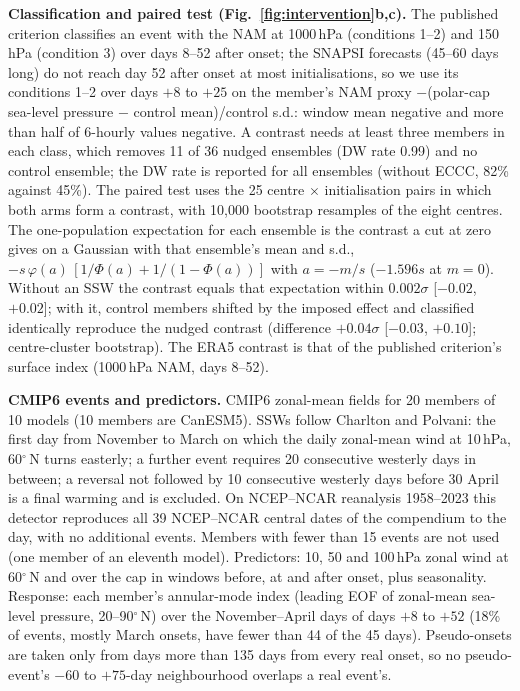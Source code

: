 \documentclass[11pt]{article}
\begin{document}
\textbf{Classification and paired test (Fig.~\ref{fig:intervention}b,c).} The published criterion\cite{karpechko17} classifies an event with the NAM at 1000\,hPa (conditions 1–2) and 150\,hPa (condition 3) over days 8–52 after onset; the SNAPSI forecasts (45–60 days long) do not reach day 52 after onset at most initialisations, so we use its conditions 1–2 over days $+8$ to $+25$ on the member's NAM proxy $-$(polar-cap sea-level pressure $-$ control mean)/control s.d.: window mean negative and more than half of 6-hourly values negative. A contrast needs at least three members in each class, which removes 11 of 36 nudged ensembles (DW rate 0.99) and no control ensemble; the DW rate is reported for all ensembles (without ECCC, 82\% against 45\%). The paired test uses the 25 centre $\times$ initialisation pairs in which both arms form a contrast, with 10,000 bootstrap resamples of the eight centres. The one-population expectation for each ensemble is the contrast a cut at zero gives on a Gaussian with that ensemble's mean and s.d., $-s\,\varphi(a)\,[1/\Phi(a) + 1/(1-\Phi(a))]$ with $a = -m/s$ ($-1.596s$ at $m = 0$). Without an SSW the contrast equals that expectation within $0.002\sigma$ [$-0.02$, $+0.02$]; with it, control members shifted by the imposed effect and classified identically reproduce the nudged contrast (difference $+0.04\sigma$ [$-0.03$, $+0.10$]; centre-cluster bootstrap). The ERA5 contrast is that of the published criterion's surface index (1000\,hPa NAM, days 8–52).

\textbf{CMIP6 events and predictors.} CMIP6 zonal-mean fields for 20 members of 10 models (10 members are CanESM5). SSWs follow Charlton and Polvani\cite{charlton07}: the first day from November to March on which the daily zonal-mean wind at 10\,hPa, 60$^\circ$\,N turns easterly; a further event requires 20 consecutive westerly days in between; a reversal not followed by 10 consecutive westerly days before 30 April is a final warming and is excluded. On NCEP–NCAR reanalysis 1958–2023 this detector reproduces all 39 NCEP–NCAR central dates of the compendium\cite{butler17} to the day, with no additional events. Members with fewer than 15 events are not used (one member of an eleventh model). Predictors: 10, 50 and 100\,hPa zonal wind at 60$^\circ$\,N and over the cap in windows before, at and after onset, plus seasonality. Response: each member's annular-mode index (leading EOF of zonal-mean sea-level pressure, 20–90$^\circ$\,N) over the November–April days of days $+8$ to $+52$ (18\% of events, mostly March onsets, have fewer than 44 of the 45 days). Pseudo-onsets are taken only from days more than 135 days from every real onset, so no pseudo-event's $-60$ to $+75$-day neighbourhood overlaps a real event's.
\end{document}
